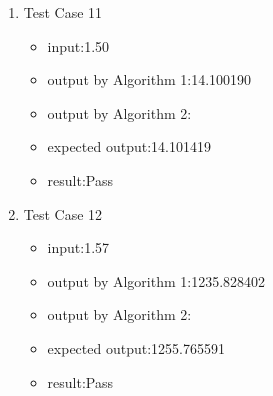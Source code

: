 \documentclass[10pt,a4paper,twoside]{article}
\begin{document}
\begin{enumerate}
\item 
Test Case 11
\begin{itemize}
    \item input:1.50
    \item output by Algorithm 1:14.100190
    \item output by Algorithm 2:
    \item expected output:14.101419
    \item result:Pass
\end{itemize}
\item 
Test Case 12
\begin{itemize}
    \item input:1.57
   \item output by Algorithm 1:1235.828402
    \item output by Algorithm 2:
    \item expected output:1255.765591
    \item result:Pass
\end{itemize}

\end{enumerate}





\end{document}
